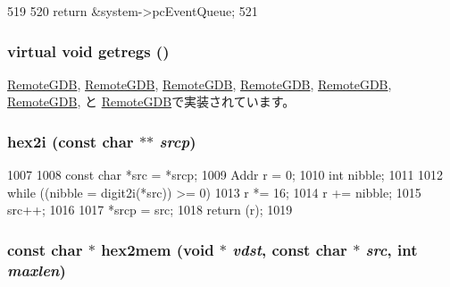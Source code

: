\begin{DoxyCode}
519 {
520     return &system->pcEventQueue;
521 }
\end{DoxyCode}
\hypertarget{classBaseRemoteGDB_aca04756a764f2ef2add9ee91be012659}{
\subsubsection[{getregs}]{\setlength{\rightskip}{0pt plus 5cm}virtual void getregs ()}}
\label{classBaseRemoteGDB_aca04756a764f2ef2add9ee91be012659}


\hyperlink{classAlphaISA_1_1RemoteGDB_a62bc8adc5a48f1cbb5eb9bb64301d38d}{RemoteGDB}, \hyperlink{classArmISA_1_1RemoteGDB_a62bc8adc5a48f1cbb5eb9bb64301d38d}{RemoteGDB}, \hyperlink{classMipsISA_1_1RemoteGDB_a62bc8adc5a48f1cbb5eb9bb64301d38d}{RemoteGDB}, \hyperlink{classMipsISA_1_1RemoteGDB_a62bc8adc5a48f1cbb5eb9bb64301d38d}{RemoteGDB}, \hyperlink{classPowerISA_1_1RemoteGDB_a62bc8adc5a48f1cbb5eb9bb64301d38d}{RemoteGDB}, \hyperlink{classSparcISA_1_1RemoteGDB_a62bc8adc5a48f1cbb5eb9bb64301d38d}{RemoteGDB}, と \hyperlink{classX86ISA_1_1RemoteGDB_a62bc8adc5a48f1cbb5eb9bb64301d38d}{RemoteGDB}で実装されています。\hypertarget{classBaseRemoteGDB_a9d71b1350a41827aa3c4e34409222bc4}{
\subsubsection[{hex2i}]{ hex2i (const char $\ast$$\ast$ {\em srcp})}}
\label{classBaseRemoteGDB_a9d71b1350a41827aa3c4e34409222bc4}



\begin{DoxyCode}
1007 {
1008     const char *src = *srcp;
1009     Addr r = 0;
1010     int nibble;
1011 
1012     while ((nibble = digit2i(*src)) >= 0) {
1013         r *= 16;
1014         r += nibble;
1015         src++;
1016     }
1017     *srcp = src;
1018     return (r);
1019 }
\end{DoxyCode}
\hypertarget{classBaseRemoteGDB_a1c09904ab1f0dfd53045815c8023ed99}{
\subsubsection[{hex2mem}]{\setlength{\rightskip}{0pt plus 5cm}const char $\ast$ hex2mem (void $\ast$ {\em vdst}, \/  const char $\ast$ {\em src}, \/  int {\em maxlen})}}
\label{classBaseRemoteGDB_a1c09904ab1f0dfd53045815c8023ed99}



